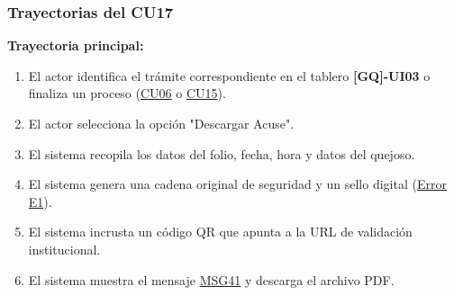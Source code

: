 \begin{appendices}
\subsubsection{Trayectorias del CU17}
\textbf{Trayectoria principal:}
\begin{enumerate}[nosep]
    \item El actor identifica el trámite correspondiente en el tablero \textbf{[GQ]-UI03} o finaliza un proceso (\hyperlink{anexo:casos_uso}{CU06} o \hyperlink{anexo:casos_uso}{CU15}).
    \item El actor selecciona la opción "Descargar Acuse".
    \item El sistema recopila los datos del folio, fecha, hora y datos del quejoso.
    \item El sistema genera una cadena original de seguridad y un sello digital (\hyperlink{err:E22}{Error E1}).
    \item El sistema incrusta un código QR que apunta a la URL de validación institucional.
    \item El sistema muestra el mensaje \hyperlink{msg:MSG41}{MSG41} y descarga el archivo PDF.
\end{enumerate}


\end{appendices}
